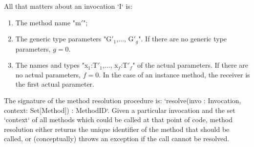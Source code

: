 All that matters about an invocation \xcd`I` is: 
\begin{enumerate}
\item The method name \xcdmath"m$'$";
\item The generic type parameters \xcdmath"G$'_1$,$\ldots$, G$'_g$".  If there
      are no generic type parameters, {$g=0$}.  
\item The names and types \xcdmath"x$_1$:T$'_1$,$\ldots$, x$_f$:T$'_f$" of the
      actual parameters.
      If
      there are no actual parameters, {$f=0$}. In the case of an instance
      method, the receiver is the first actual parameter.
\end{enumerate}

The signature of the method resolution procedure is: 
\xcd`resolve(invo : Invocation, context: Set[Method]) : MethodID`.  
Given a particular invocation and the set \xcd`context` of all methods
which could be called at that point of code, method resolution either returns
the unique identifier of the method that should be called, or (conceptually)
throws an exception if the call cannot be resolved.

